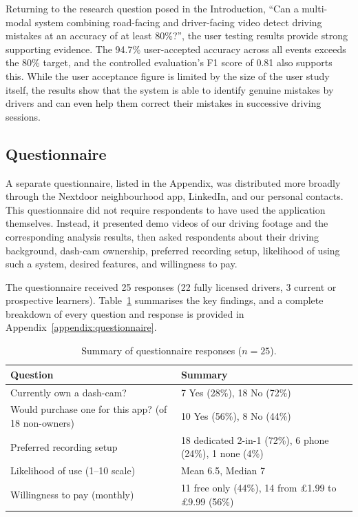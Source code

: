 \documentclass{article}
\begin{document}
Returning to the research question posed in the Introduction, ``Can a multi-modal system combining road-facing and driver-facing video detect driving mistakes at an accuracy of at least 80\%?'', the user testing results provide strong supporting evidence. The 94.7\% user-accepted accuracy across all events exceeds the 80\% target, and the controlled evaluation's F1 score of 0.81 also supports this. While the user acceptance figure is limited by the size of the user study itself, the results show that the system is able to identify genuine mistakes by drivers and can even help them correct their mistakes in successive driving sessions.

\subsection{Questionnaire}
\label{sec:questionnaire_results}
A separate questionnaire, listed in the Appendix, was distributed more broadly through the Nextdoor neighbourhood app, LinkedIn, and our personal contacts. This questionnaire did not require respondents to have used the application themselves. Instead, it presented demo videos of our driving footage and the corresponding analysis results, then asked respondents about their driving background, dash-cam ownership, preferred recording setup, likelihood of using such a system, desired features, and willingness to pay.

The questionnaire received 25 responses (22 fully licensed drivers, 3 current or prospective learners). Table~\ref{tab:survey_results} summarises the key findings, and a complete breakdown of every question and response is provided in Appendix~\ref{appendix:questionnaire}.

\begin{table}[H]
\centering
\small
\begin{tabular}{|l|l|}
\hline
\textbf{Question} & \textbf{Summary} \\
\hline
Currently own a dash-cam? & 7 Yes (28\%), 18 No (72\%) \\
Would purchase one for this app? (of 18 non-owners) & 10 Yes (56\%), 8 No (44\%) \\
Preferred recording setup & 18 dedicated 2-in-1 (72\%), 6 phone (24\%), 1 none (4\%) \\
Likelihood of use (1--10 scale) & Mean 6.5, Median 7 \\
Willingness to pay (monthly) & 11 free only (44\%), 14 from \pounds1.99 to \pounds9.99 (56\%) \\
\hline
\end{tabular}
\caption{Summary of questionnaire responses ($n = 25$).}
\label{tab:survey_results}
\end{table}
\end{document}
